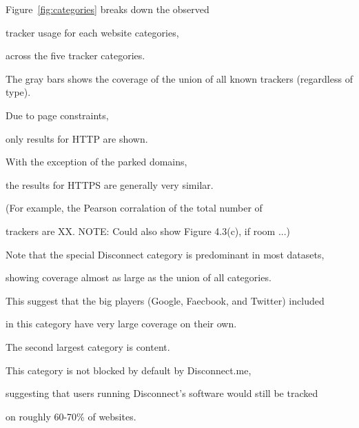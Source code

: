 \documentclass{sig-alternate-10pt}
\begin{document}




Figure~\ref{fig:categories} breaks down the observed 

tracker usage for each website categories,

across the five tracker categories.

The gray bars shows the coverage of the union of all known trackers (regardless of type).  

Due to page constraints, 

only results for HTTP are shown.

With the exception of the parked domains,

the results for HTTPS are generally very similar.


(For example, the Pearson corralation of the total number of

trackers are XX.  NOTE: Could also show Figure 4.3(c), if room ...)





Note that the  special Disconnect category is predominant in most datasets, 

showing coverage almost as large as the union of all categories. 

This suggest that the big players (Google, Faecbook, and Twitter) included

in this category have very large coverage on their own.

The second largest category is content.

This category is not blocked by default by Disconnect.me,

suggesting that users running Disconnect's software would still be tracked

on roughly 60-70\% of websites.




\end{document}
